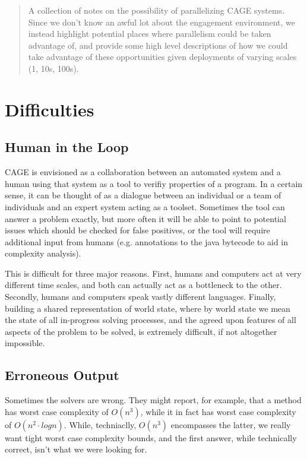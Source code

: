 \documentclass{article}
\author{Jordan T. Thayer}
\begin{document}
\begin{abstract}
  A collection of notes on the possibility of parallelizing CAGE systems.  Since
  we don't know an awful lot about the engagement environment, we instead
  highlight potential places where parallelism could be taken advantage of, and
  provide some high level descriptions of how we could take advantage of these
  opportunities given deployments of varying scales (1, 10s, 100s).
\end{abstract}

\section{Difficulties}
\subsection{Human in the Loop}
  CAGE is envisioned as a collaboration between an automated system and a human
  using that system as a tool to verifiy properties of a program.  In a certain
  sense, it can be thought of as a dialogue between an individual or a team of
  individuals and an expert system acting as a toolset. Sometimes the tool can
  answer a problem exactly, but more often it will be able to point to potential
  issues which should be checked for false positives, or the tool will require
  additional input from humans (e.g. annotations to the java bytecode to aid in
  complexity analysis).

  This is difficult for three major reasons.  First, humans and computers act at
  very different time scales, and both can actually act as a bottleneck to the
  other. Secondly, humans and computers speak vastly different languages.
  Finally, building a shared representation of world state, where by world state
  we mean the state of all in-progress solving processes, and the agreed upon
  features of all aspects of the problem to be solved, is extremely difficult,
  if not altogether impossible.

\subsection{Erroneous Output}
  Sometimes the solvers are wrong. They might report, for example, that a method
  has worst case complexity of $O(n^3)$, while it in fact has worst case
  complexity of $O(n^2 \cdot log n)$.  While, techniaclly, $O(n^3)$ encompasses
  the latter, we really want tight worst case complexity bounds, and the first
  answer, while technically correct, isn't what we were looking for.
\end{document}
